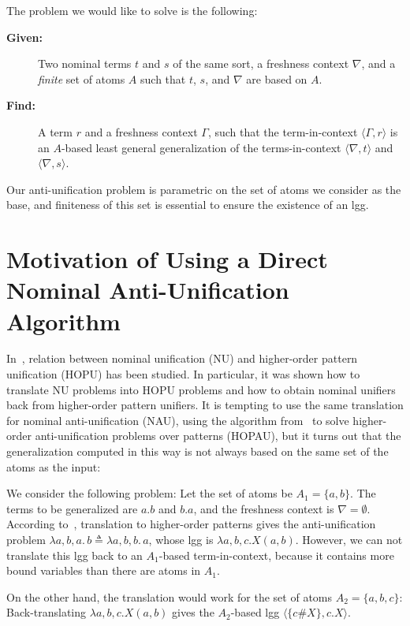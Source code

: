 \documentclass{llncs}
\newcommand{\np}[2]{\langle #1, \allowbreak #2\rangle}
\begin{document}
The problem we would like to solve is the following: 
\vspace{0.2cm}
\begin{description}
  \item[\bf Given:] Two nominal terms $ t$ and $ s$ of the same
    sort, a freshness context $\nabla$, and a \emph{finite} set of atoms $A$
    such that $ t$, $ s$, and $\nabla$ are based on $A$.  
  \item[\bf Find:] A term $ r$ and a freshness context $\Gamma$, such
    that the term-in-context $\np{\Gamma}{r}$ is an $A$-based least
    general generalization of the terms-in-context $\np{\nabla}{t}$
    and $\np{\nabla}{s}$.
\end{description}
\vspace{0.2cm}


Our anti-unification problem is parametric on the set of atoms we
consider as the base, and finiteness of this set is essential to
ensure the existence of an lgg.  

\section{Motivation of Using a Direct Nominal Anti-Unification Algorithm}
\label{sect:motivation}

In~\cite{DBLP:journals/tocl/LevyV12}, relation between nominal
unification (NU) and higher-order pattern unification (HOPU) has been
studied. In particular, it was shown how to translate NU problems into
HOPU problems and how to obtain nominal unifiers back from
higher-order pattern unifiers. It is tempting to use the same
translation for nominal anti-unification (NAU), using the algorithm
from~\cite{DBLP:conf/rta/BaumgartnerKLV13} to solve higher-order
anti-unification problems over patterns (HOPAU), but it turns out that
the generalization computed in this way is not always based on the
same set of the atoms as the input:

\begin{example}
\label{exmp:translation}
We consider the following problem:
Let the set of atoms be $A_1=\{a,b\}$. The terms to be generalized are $a.b$ and $b.a$, and the freshness context is $\nabla=\emptyset$.
According to~\cite{DBLP:journals/tocl/LevyV12}, translation to higher-order patterns
gives the anti-unification problem $\lambda a,b,a.\,b \triangleq
\lambda a,b,b.\,a$, whose lgg is $\lambda a,b,c. X(a,b)$. However, we
can not translate this lgg back to an $A_1$-based term-in-context,
because it contains more bound variables than there are atoms in
$A_1$.

On the other hand, the translation would work for the 
set of atoms $A_2=\{a,b,c\}$:
Back-translating $\lambda
a,b,c. X(a,b)$ gives the $A_2$-based lgg $\np{\{c\#X\}}{c.X}$.
\end{example}
\end{document}
